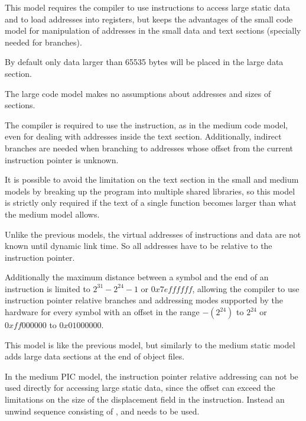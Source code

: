 \begin{description}
  This model requires the compiler to use  instructions
  to access large static data and to load addresses into registers, but
  keeps the advantages of the small code model for manipulation of
  addresses in the small data and text sections (specially needed for
  branches).

  By default only data larger than 65535 bytes will be placed in the
  large data section.

\item[\textindex{Large code model}]

  The large code model makes no assumptions about addresses and sizes
  of sections.

  The compiler is required to use the  instruction, as in
  the medium code model, even for dealing with addresses inside the
  text section.  Additionally, indirect branches are needed when
  branching to addresses whose offset from the current instruction
  pointer is unknown.

  It is possible to avoid the limitation on the text section in the
  small and medium models by breaking up the program into multiple
  shared libraries, so this model is strictly only required if the text
  of a single function becomes larger than what the medium model allows.

\item[\textindex{Small position independent code model} (\textindex{PIC})]

  Unlike the previous models, the virtual addresses of instructions
  and data are not known until dynamic link time.  So all addresses
  have to be relative to the instruction pointer.

  Additionally the maximum distance between a symbol and the end of an
  instruction is limited to $2^{31}-2^{24}-1$ or $0x7effffff$, allowing the compiler
  to use instruction pointer relative branches and addressing modes
  supported by the hardware for every symbol with an offset in the
  range $-(2^{24})$ to $2^{24}$ or $0xff000000$ to $0x01000000$.

\item[\textindex{Medium position independent code model}
  (\textindex{PIC})]

  This model is like the previous model, but similarly to the medium static
  model adds large data sections at the end of object files.

  In the medium PIC model, the instruction pointer relative addressing
  can not be used directly for accessing large static data, since the
  offset can exceed the limitations on the size of the displacement
  field in the instruction.  Instead an unwind sequence consisting of
  ,  and  needs to be used.


\end{description}
